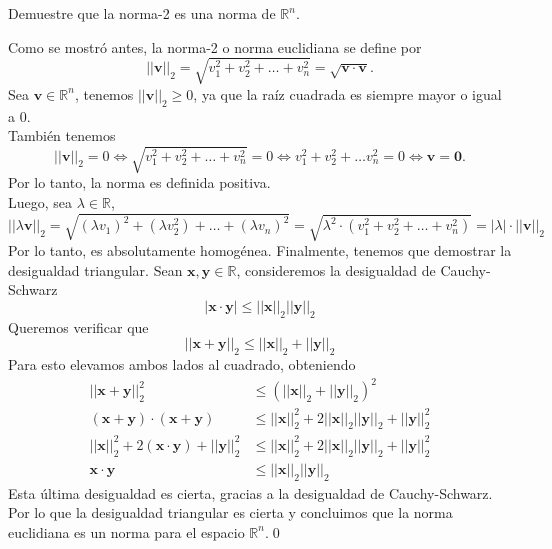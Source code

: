 \documentclass[12pt]{book}
\begin{document}
\begin{exampleenv}
    Demuestre que la norma-2 es una norma de $\mathbb{R}^n$.

    Como se mostró antes, la norma-2 o norma euclidiana se define por
    \[
    ||\mathbf{v}||_2=\sqrt{v_1^2+v_2^2+\dots +v_n^2}=\sqrt{\mathbf{v}\cdot \mathbf{v}}.
    \]
    Sea $\mathbf{v}\in\mathbb{R}^n$, tenemos $||\mathbf{v}||_2\ge0$, ya que la raíz cuadrada es siempre mayor o igual a 0.\\

    También tenemos
    \[
    ||\mathbf{v}||_2=0\iff \sqrt{v_1^2+v_2^2+\dots +v_n^2}=0\iff v_1^2+v_2^2+\dots v_n^2=0\iff \mathbf{v}=\mathbf{0}.
    \]
    Por lo tanto, la norma es definida positiva.\\

    Luego, sea $\lambda\in\mathbb{R}$,
    \[
    ||\lambda\mathbf{v}||_2=\sqrt{(\lambda v_1)^2+(\lambda v_2^2)+\dots+(\lambda v_n)^2}=\sqrt{\lambda^2\cdot(v_1^2+v_2^2+\dots+v_n^2)}=|\lambda|\cdot||\mathbf{v}||_2
    \]
    Por lo tanto, es absolutamente homogénea.
    Finalmente, tenemos que demostrar la desigualdad triangular. Sean $\mathbf{x},\mathbf{y}\in\mathbb{R}$, consideremos la desigualdad de Cauchy-Schwarz
    \[
    |\mathbf{x}\cdot\mathbf{y}|\leq ||\mathbf{x}||_2||\mathbf{y}||_2
    \]
    Queremos verificar que
    \[
    ||\mathbf{x+\mathbf{y}}||_2\leq||\mathbf{x}||_2+||\mathbf{y}||_2
    \]
    Para esto elevamos ambos lados al cuadrado, obteniendo
    \begin{align*}
        ||\mathbf{x+\mathbf{y}}||_2^2&\leq(||\mathbf{x}||_2+||\mathbf{y}||_2)^2\\
        (\mathbf{x}+\mathbf{y})\cdot(\mathbf{x}+\mathbf{y})&\leq||\mathbf{x}||_2^2+2||\mathbf{x}||_2||\mathbf{y}||_2+||\mathbf{y}||_2^2\\
        ||\mathbf{x}||_2^2+2(\mathbf{x}\cdot\mathbf{y})+||\mathbf{y}||_2^2&\leq||\mathbf{x}||_2^2+2||\mathbf{x}||_2||\mathbf{y}||_2+||\mathbf{y}||_2^2\\
        \mathbf{x}\cdot\mathbf{y}&\leq||\mathbf{x}||_2||\mathbf{y}||_2
    \end{align*}
    Esta última desigualdad es cierta, gracias a la desigualdad de Cauchy-Schwarz. Por lo que la desigualdad triangular es cierta y concluimos que la norma euclidiana es un norma para el espacio $\mathbb{R}^n$.\qed
\end{exampleenv}
\end{document}
